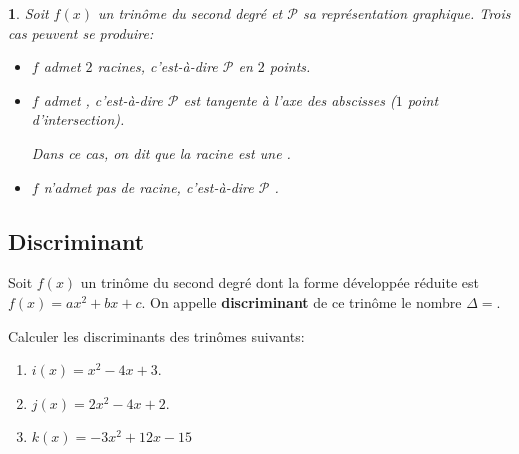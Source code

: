 \documentclass{beamer}
\newtheorem{proposition}[theorem]{\translate{Proposition}}
\begin{document}
\begin{frame}
  \begin{proposition}
   Soit $f(x)$ un trinôme du second degré et $\mathcal{P}$ sa représentation graphique.
    Trois cas peuvent se produire:
   
   \begin{itemize}
    \item $f$ admet $2$ racines, c'est-à-dire $\mathcal{P}$ 
    en $2$ points.
    \item $f$ admet , c'est-à-dire $\mathcal{P}$
    est tangente à l'axe
    des abscisses ($1$ point d'intersection).
    
    Dans ce cas, on dit que la racine est une .
    
    \item $f$ n'admet pas de racine, c'est-à-dire $\mathcal{P}$ 
    .
   \end{itemize}
   
  \end{proposition}
\end{frame}

\subsection{Discriminant}

\begin{frame}
 \begin{definition}[Discriminant]
    Soit $f(x)$ un trinôme du second degré dont la forme développée réduite
    est $f(x)=ax^2+bx+c$. On appelle \textbf{discriminant} de ce trinôme
    le nombre $\Delta=$.
    
  \end{definition}
  
  \begin{example}
    
    Calculer les discriminants des trinômes suivants:
    \begin{enumerate}
     \item $i(x)=x^2-4x+3$.
     \item $j(x)=2x^2-4x+2$.
     \item $k(x)=-3x^2+12x-15$
    \end{enumerate}
   \end{example}
\end{frame}
\end{document}
